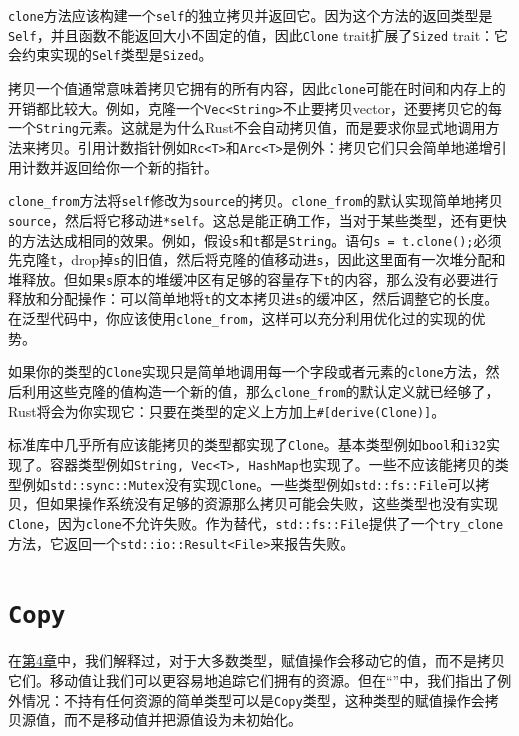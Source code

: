 \texttt{clone}方法应该构建一个\texttt{self}的独立拷贝并返回它。因为这个方法的返回类型是\texttt{Self}，并且函数不能返回大小不固定的值，因此\texttt{Clone} trait扩展了\texttt{Sized} trait：它会约束实现的\texttt{Self}类型是\texttt{Sized}。

拷贝一个值通常意味着拷贝它拥有的所有内容，因此\texttt{clone}可能在时间和内存上的开销都比较大。例如，克隆一个\texttt{Vec<String>}不止要拷贝vector，还要拷贝它的每一个\texttt{String}元素。这就是为什么Rust不会自动拷贝值，而是要求你显式地调用方法来拷贝。引用计数指针例如\texttt{Rc<T>}和\texttt{Arc<T>}是例外：拷贝它们只会简单地递增引用计数并返回给你一个新的指针。

\texttt{clone\_from}方法将\texttt{self}修改为\texttt{source}的拷贝。\texttt{clone\_from}的默认实现简单地拷贝\texttt{source}，然后将它移动进\texttt{*self}。这总是能正确工作，当对于某些类型，还有更快的方法达成相同的效果。例如，假设\texttt{s}和\texttt{t}都是\texttt{String}。语句\texttt{s = t.clone();}必须先克隆\texttt{t}，drop掉\texttt{s}的旧值，然后将克隆的值移动进\texttt{s}，因此这里面有一次堆分配和堆释放。但如果\texttt{s}原本的堆缓冲区有足够的容量存下\texttt{t}的内容，那么没有必要进行释放和分配操作：可以简单地将\texttt{t}的文本拷贝进\texttt{s}的缓冲区，然后调整它的长度。在泛型代码中，你应该使用\texttt{clone\_from}，这样可以充分利用优化过的实现的优势。

如果你的类型的\texttt{Clone}实现只是简单地调用每一个字段或者元素的\texttt{clone}方法，然后利用这些克隆的值构造一个新的值，那么\texttt{clone\_from}的默认定义就已经够了，Rust将会为你实现它：只要在类型的定义上方加上\texttt{\#[derive(Clone)]}。

标准库中几乎所有应该能拷贝的类型都实现了\texttt{Clone}。基本类型例如\texttt{bool}和\texttt{i32}实现了。容器类型例如\texttt{String, Vec<T>, HashMap}也实现了。一些不应该能拷贝的类型例如\texttt{std::sync::Mutex}没有实现\texttt{Clone}。一些类型例如\texttt{std::fs::File}可以拷贝，但如果操作系统没有足够的资源那么拷贝可能会失败，这些类型也没有实现\texttt{Clone}，因为\texttt{clone}不允许失败。作为替代，\texttt{std::fs::File}提供了一个\texttt{try\_clone}方法，它返回一个\texttt{std::io::Result<File>}来报告失败。

\section{\texttt{Copy}}\label{Copy}

在\hyperref[ch04]{第4章}中，我们解释过，对于大多数类型，赋值操作会移动它的值，而不是拷贝它们。移动值让我们可以更容易地追踪它们拥有的资源。但在“”中，我们指出了例外情况：不持有任何资源的简单类型可以是\texttt{Copy}类型，这种类型的赋值操作会拷贝源值，而不是移动值并把源值设为未初始化。

